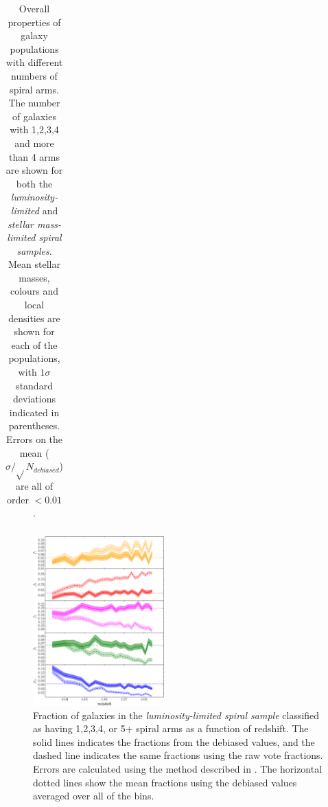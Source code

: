\documentclass[useAMS,usenatbib]{mn2e}
\begin{document}
\begin{table}
\begin{tabular}{cccccccccc}
\end{tabular}

\caption{Overall properties of galaxy populations with different numbers of spiral arms. The number of galaxies with 1,2,3,4 and more than 4 arms are shown for both the \textit{luminosity-limited} and \textit{stellar mass-limited spiral samples}. Mean stellar masses, colours and local densities are shown for each of the populations, with $1 \sigma$ standard deviations indicated in parentheses. Errors on the mean ($\sigma / \sqrt{}N_{debiased}$) are all of order $ < 0.01$.}

\label{table:overall_property_table}

\end{table}

\begin{figure}
		\centering

        \includegraphics[width=0.45\textwidth]{Images/Results/sample_fractions.pdf}

        \caption{Fraction of galaxies in the \textit{luminosity-limited spiral sample} classified as having 1,2,3,4, or 5+ spiral arms as a function of redshift. The solid lines indicates the fractions from the debiased values, and the dashed line indicates the same fractions using the raw vote fractions. Errors are calculated using the method described in \citet{Cameron_11}. The horizontal dotted lines show the mean fractions using the debiased values averaged over all of the bins.}

        \label{fig:arm_number_trend}

\end{figure}
\end{document}
